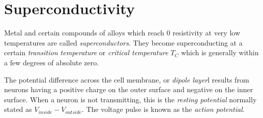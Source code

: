 \section{Superconductivity}

\begin{definition}[Superconducting]
    Metal and certain compounds of alloys which reach 0 resistivity at very low temperatures are called \emph{superconductors}. They become superconducting  at a certain \emph{transition temperature} or \emph{critical temperature} $T_C$ which is generally within a few degrees of absolute zero.
\end{definition}
\begin{remark}
    The potential difference across the cell membrane, or \emph{dipole layer}l results from neurons having a positive charge on the outer surface and negative on the inner surface. When a neuron is not transmitting, this is the \emph{resting potential} normally stated as $V_{inside} - V_{outside}.$ The voltage pulse is known as the \emph{action potential}.
\end{remark}